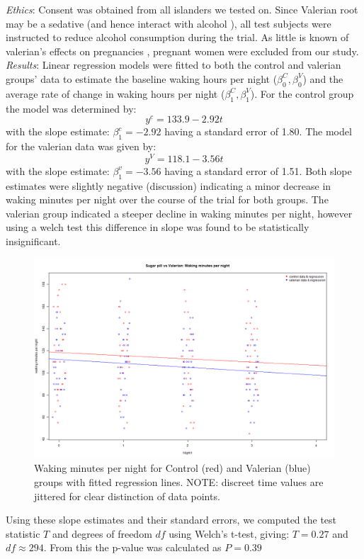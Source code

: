 \documentclass[10pt,preprintnumbers,amsmath,amssymb,floatfix,twocolumn,prl]{revtex4-2}
\begin{document}
\textit{Ethics}: Consent was obtained from all islanders we tested on. Since Valerian root may be a sedative (and hence interact with alcohol \cite{ValerianSource1}), all test subjects were instructed to reduce alcohol consumption during the trial. As little is known of valerian's effects on pregnancies \cite{ValerianSource2}, pregnant women were excluded from our study. \\

\textit{Results}: Linear regression models were fitted to both the control and valerian groups' data to estimate the baseline waking hours per night ($\beta_0^C, \beta_0^V$) and the average rate of change in waking hours per night ($\beta_1^C, \beta_1^V$). For the control group the model was determined by:
$$
y^c = 133.9 - 2.92 t
$$
with the slope estimate: $\beta_1^c = - 2.92$ having a standard error of 1.80.
The model for the valerian data was given by: 
$$
y^V = 118.1 - 3.56 t
$$
with the slope estimate: $\beta_1^v = - 3.56$ having a standard error of 1.51.
Both slope estimates were slightly negative (discussion) indicating a minor decrease in waking minutes per night over the course of the trial for both groups. The valerian group indicated a steeper decline in waking minutes per night, however using a welch test this difference in slope was found to be statistically insignificant. 
\begin{figure}[H]
\centering
\includegraphics[width=0.95\linewidth]{linear_reg.png}
\caption{Waking minutes per night for Control (red) and Valerian (blue) groups with fitted regression lines. NOTE: discreet time values are jittered for clear distinction of data points.}
\end{figure}
Using these slope estimates and their standard errors, we computed the test statistic $T$ and degrees of freedom $df$ using Welch's t-test, giving: $T = 0.27$ and $df \approx 294$. From this the p-value was calculated as $P = 0.39$
\end{document}
